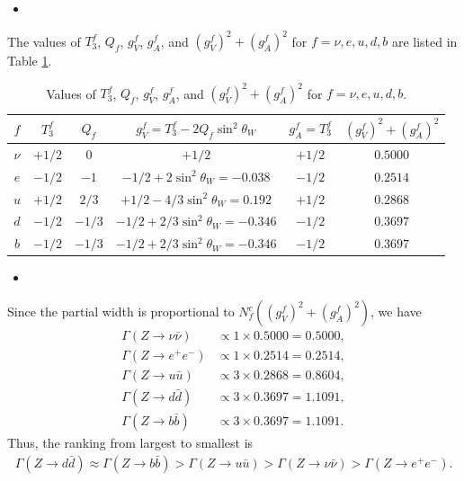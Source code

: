 \answer{}
\begin{itemize}
    \item [(a)]
\end{itemize}
The values of $T_3^f$, $Q_f$, $g_V^f$, $g_A^f$, and $(g_V^f)^2 + (g_A^f)^2$ for $f=\nu, e, u, d, b$ are listed in Table \ref{HW7:table: Quantum numbers and couplings}.
\begin{table}[h!]
\centering
\begin{tabular}{|c| c | c|  c|  c | c |} 
    \hline
    $f$ & $T_3^f$ & $Q_f$  & $g_V^f=T_3^f - 2 Q_f \sin^2\theta_W$ & $g_A^f=T_3^f$  & $(g_V^f)^2 + (g_A^f)^2$ \\
    \hline
    $\nu$ & $+1/2$ & $0$ & $+1/2$ &$+1/2$ &$0.5000$ \\
    $e$ & $-1/2$ & $-1$ & $-1/2+2\sin^2\theta_W=-0.038$ & $-1/2$&  $0.2514$\\
    $u$ & $+1/2$ & $2/3$ & $+1/2-4/3\sin^2\theta_W=0.192$ & $+1/2$&  $0.2868$ \\
    $d$ & $-1/2$ & $-1/3$ & $-1/2+2/3\sin^2\theta_W=-0.346$ & $-1/2$&  $0.3697$ \\
    $b$ & $-1/2$ & $-1/3$ & $-1/2+2/3\sin^2\theta_W=-0.346$ & $-1/2$&  $0.3697$ \\
    \hline
\end{tabular}
\caption{ Values of $T_3^f$, $Q_f$, $g_V^f$, $g_A^f$, and $(g_V^f)^2 + (g_A^f)^2$ for $f=\nu, e, u, d, b$.}
\label{HW7:table: Quantum numbers and couplings}
\end{table}

\begin{itemize}
    \item [(b)]
\end{itemize}
Since the partial width is proportional to $N_f^c ((g_V^f)^2 + (g_A^f)^2)$, we have
\begin{align}
    \Gamma(Z\to\nu\bar{\nu}) &\propto 1 \times 0.5000 = 0.5000, \\
    \Gamma(Z\to e^+ e^-) &\propto 1 \times 0.2514 = 0.2514, \\
    \Gamma(Z\to u \bar{u}) &\propto 3 \times 0.2868 = 0.8604, \\
    \Gamma(Z\to d \bar{d}) &\propto 3 \times 0.3697 = 1.1091, \\
    \Gamma(Z\to b \bar{b}) &\propto 3 \times 0.3697 = 1.1091.
\end{align}
Thus, the ranking from largest to smallest is
\begin{align}
    \Gamma(Z\to d \bar{d}) \approx \Gamma(Z\to b \bar{b}) > \Gamma(Z\to u \bar{u}) > \Gamma(Z\to \nu \bar{\nu}) > \Gamma(Z\to e^+ e^-).
\end{align}

